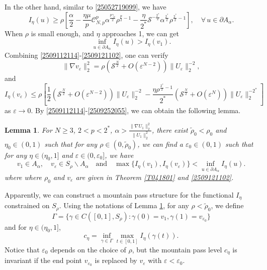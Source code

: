 \documentclass[10pt]{article}
\numberwithin{equation}{section}
\newtheorem{lemma}[theorem]{Lemma}
\numberwithin{equation}{section}
\begin{document}
In the other hand, similar to \eqref{25052719099}, we have
\begin{equation}\label{2509252053}
I_\eta(u)\ge \rho\left[\frac{\alpha}{2}
-\frac{\eta\mu}{p}\mathcal{C}^{p}_{N,p}\alpha^{\frac{p\gamma_{p}}{2}}\rho^{\frac{p}{2}-1}
-\frac{\eta}{2^{*}}\mathcal{S}^{-\frac{2^{*}}{2}}\alpha^{\frac{2^{*}}{2}}\rho^{\frac{2^{*}}{2}-1}\right],\quad \forall\, u\in \partial A_\alpha.
\end{equation}
When  $\rho$ is small enough, and $\eta$ approaches 1, we can get
\begin{equation}\label{2509252052}
\underset{u\in \partial A_\alpha}{\inf}I_\eta(u)>I_\eta(v_1).
\end{equation}
Combining \eqref{2509112114}-\eqref{2509121102}, one can verify
\begin{equation}\label{2509252054}
\|\nabla v_\varepsilon\|_2^2=\rho\left({\mathcal{S}}^{\frac{N}{2}}+O(\varepsilon^{N-2})\right)\|U_\varepsilon\|^{-2}_2,
\end{equation}
and
\begin{equation}\label{2509252055}
I_\eta(v_\varepsilon)\le  \rho\left[\frac{1}{2}
\left({\mathcal{S}}^{\frac{N}{2}}+O(\varepsilon^{N-2})\right)\|U_\varepsilon\|^{-2}_2
-\frac{\eta\rho^{\frac{2^*}{2}-1}}{2^*}\left({\mathcal{S}}^{\frac{N}{2}}+O(\varepsilon^{N})\right)\|U_\varepsilon\|^{-2^*}_2\right]
\end{equation}
as $\varepsilon\to 0$. By \eqref{2509112114}-\eqref{2509252055}, we can obtain the following lemma.
\begin{lemma}\label{2509112067}
 For $N\ge 3$, $2<p<2^*$, $\alpha>\frac{\|\nabla U_1\|_2^2}{\|U_1\|_2^2}$, there exist  $\widetilde{\rho}_0<\rho_0$ and $\eta_0\in (0,1)$ such that for any $\rho\in (0, \widetilde{\rho}_0)$, we can find  
  a $\varepsilon_0\in (0, 1)$ such that for any  $\eta\in (\eta_0, 1]$ and $\varepsilon\in (0, \varepsilon_0]$, we have
 \[
 v_1\in A_\alpha,\quad v_{\varepsilon}\in S_\rho\backslash A_\alpha\quad\mbox{and}\quad \max\{I_\eta(v_1), I_\eta(v_{\varepsilon})\}<\underset{u\in \partial A_\alpha}{\inf}I_\eta(u).
 \]
where where $\rho_0$ and $v_\varepsilon$  are given in Theorem \ref{T041801} and   \eqref{2509121102}.
\end{lemma}

Apparently,  we can construct a mountain pass structure for the functional $I_\eta$ constrained on $S_\rho$. Using the notations of Lemma \ref{2509112067}, for any $\rho< \widetilde{\rho}_0$, we define
\[
\Gamma=\{\gamma \in C([0,1], S_\rho): \gamma (0)=v_1, \gamma (1)=v_{\varepsilon_0}\}
\]
 and for $\eta\in (\eta_0, 1]$,
\begin{equation}\label{2509112066}
c_\eta= \underset{\gamma\in\Gamma}{\inf}\underset{t\in [0,1]}{\max} {I_\eta(\gamma(t))}.
\end{equation}
Notice that $\varepsilon_0$ depends on the choice of $\rho$, but  the mountain pass level $c_\eta$ is invariant if the end point $v_{\varepsilon_0}$ is replaced by $v_{\varepsilon}$ with $\varepsilon<\varepsilon_0$. 
\end{document}
